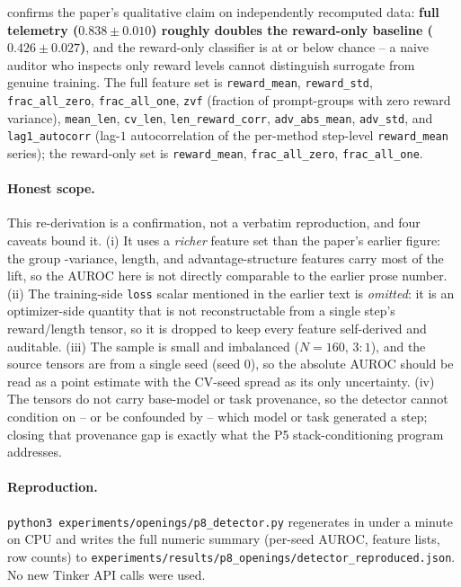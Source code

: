  confirms the paper's qualitative
claim on independently recomputed data: \textbf{full telemetry
($0.838 \pm 0.010$) roughly doubles the reward-only baseline
($0.426 \pm 0.027$)}, and the reward-only classifier is at or below
chance -- a naive auditor who inspects only reward levels cannot
distinguish surrogate from genuine training. The full feature set is
\texttt{reward\_mean}, \texttt{reward\_std}, \texttt{frac\_all\_zero},
\texttt{frac\_all\_one}, \texttt{zvf} (fraction of prompt-groups with
zero reward variance), \texttt{mean\_len}, \texttt{cv\_len},
\texttt{len\_reward\_corr}, \texttt{adv\_abs\_mean}, \texttt{adv\_std},
and \texttt{lag1\_autocorr} (lag-$1$ autocorrelation of the per-method
step-level \texttt{reward\_mean} series); the reward-only set is
\texttt{reward\_mean}, \texttt{frac\_all\_zero}, \texttt{frac\_all\_one}.

\paragraph{Honest scope.} This re-derivation is a confirmation, not a
verbatim reproduction, and four caveats bound it. (i) It uses a
\emph{richer} feature set than the paper's earlier figure: the group
-variance, length, and advantage-structure features carry most of the
lift, so the AUROC here is not directly comparable to the earlier
prose number. (ii) The training-side \texttt{loss} scalar mentioned in
the earlier text is \emph{omitted}: it is an optimizer-side quantity
that is not reconstructable from a single step's reward/length tensor,
so it is dropped to keep every feature self-derived and auditable.
(iii) The sample is small and imbalanced ($N{=}160$, $3{:}1$), and the
source tensors are from a single seed (seed $0$), so the absolute AUROC
should be read as a point estimate with the CV-seed spread as its only
uncertainty. (iv) The tensors do not carry base-model or task
provenance, so the detector cannot condition on -- or be confounded by
-- which model or task generated a step; closing that provenance gap is
exactly what the P5 stack-conditioning program addresses.

\paragraph{Reproduction.} \texttt{python3
experiments/openings/p8\_detector.py} regenerates
 in under a minute on CPU and
writes the full numeric summary (per-seed AUROC, feature lists, row
counts) to
\texttt{experiments/results/p8\_openings/detector\_reproduced.json}. No
new Tinker API calls were used.
